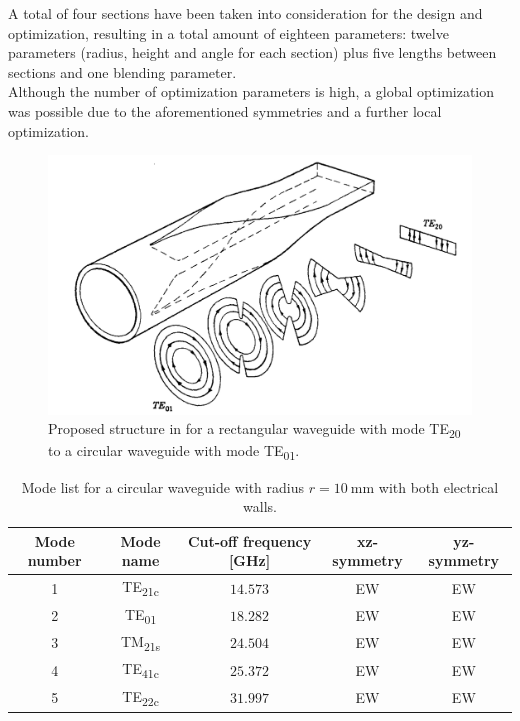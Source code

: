 \documentclass[english,twoside]{article}
\begin{document}
    A total of four sections have been taken into consideration for the design and optimization, resulting in a total amount of eighteen parameters: twelve parameters (radius, height and angle for each section) plus five lengths between sections and one blending parameter.\\
    
    Although the number of optimization parameters is high, a global optimization was possible due to the aforementioned symmetries and a further local optimization.
    
    \begin{figure}[H]
			\centering
			\includegraphics[width=.7\textwidth]{figures/book_wrTE20ToWcTE01}
			\caption{Proposed structure in \cite{montgomery} for a rectangular waveguide with mode TE\textsubscript{20} to a circular waveguide with mode TE\textsubscript{01}.}
			\label{fig:book_wrTE20ToWcTE01}
		\end{figure}
  
		\begin{table}[H]
			\centering		
			\caption{Mode list for a circular waveguide with radius $r=\SI{10}{\milli\meter}$ with both electrical walls.}
			\begin{tabular}{c|c|c|c|c}
				Mode number & Mode name & Cut-off frequency [GHz] & xz-symmetry & yz-symmetry\\
				\hline
				1 & TE\textsubscript{21c} & $\num{14.573}$ & EW & EW\\
				2 & TE\textsubscript{01} & $\num{18.282}$ & EW & EW\\
				3 & TM\textsubscript{21s} & $\num{24.504}$ & EW & EW\\
				4 & TE\textsubscript{41c} & $\num{25.372}$ & EW & EW\\
				5 & TE\textsubscript{22c} & $\num{31.997}$ & EW & EW\\	
			\end{tabular}
			\label{table:wc20_ee}
		\end{table}
	
\end{document}

